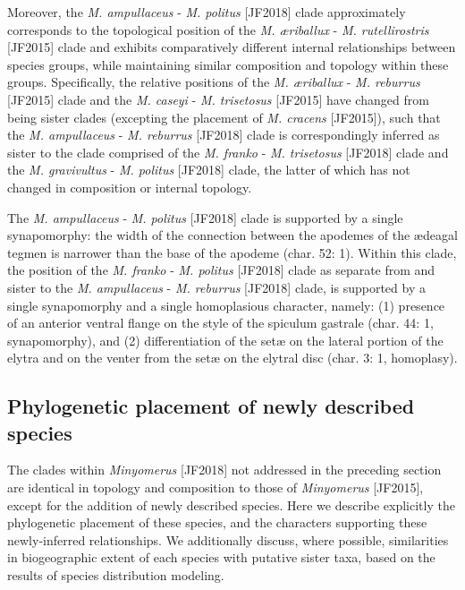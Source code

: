 \documentclass[fleqn,10pt,lineno]{wlpeerj} %
\begin{document}
		Moreover, the \textit{M. ampullaceus} - \textit{M. politus} [JF2018] clade approximately corresponds to the topological position of the \textit{M. {\ae}riballux} - \textit{M. rutellirostris} [JF2015] clade and exhibits comparatively different internal relationships between species groups, while maintaining similar composition and topology within these groups.
		Specifically, the relative positions of the \textit{M. {\ae}riballux} - \textit{M. reburrus} [JF2015] clade and the \textit{M. caseyi} - \textit{M. trisetosus} [JF2015] have changed from being sister clades (excepting the placement of \textit{M. cracens} [JF2015]), such that the \textit{M. ampullaceus} - \textit{M. reburrus} [JF2018] clade is correspondingly inferred as sister to the clade comprised of the \textit{M. franko} - \textit{M. trisetosus} [JF2018] clade and the \textit{M. gravivultus} - \textit{M. politus} [JF2018] clade, the latter of which has not changed in composition or internal topology.
		
		The \textit{M. ampullaceus} - \textit{M. politus} [JF2018] clade is supported by a single synapomorphy: the width of the connection between the apodemes of the {\ae}deagal tegmen is narrower than the base of the apodeme (char. 52: 1).
		Within this clade, the position of the \textit{M. franko} - \textit{M. politus} [JF2018] clade as separate from and sister to the \textit{M. ampullaceus} - \textit{M. reburrus} [JF2018] clade, is supported by a single synapomorphy and a single homoplasious character, namely: (1) presence of an anterior ventral flange on the style of the spiculum gastrale (char. 44: 1, synapomorphy), and (2) differentiation of the set{\ae} on the lateral portion of the elytra and on the venter from the set{\ae} on the elytral disc (char. 3: 1, homoplasy).		
		
	\subsection*{Phylogenetic placement of newly described species}
		The clades within \textit{Minyomerus} [JF2018] not addressed in the preceding section are identical in topology and composition to those of \textit{Minyomerus} [JF2015], except for the addition of newly described species.
		Here we describe explicitly the phylogenetic placement of these species, and the characters supporting these newly-inferred relationships.
		We additionally discuss, where possible, similarities in biogeographic extent of each species with putative sister taxa, based on the results of species distribution modeling.
		
\end{document}
